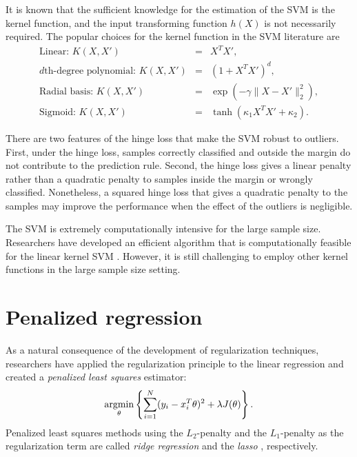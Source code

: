 \documentclass[12pt]{article}
\newcommand{\argmin}{\mathop{\rm argmin}\limits}
\begin{document}
It is known that the sufficient knowledge for the estimation of the SVM is the kernel function, and the input transforming function $h(X)$ is not necessarily required. The popular choices for the kernel function in the SVM literature are
\begin{eqnarray*}
\text{Linear: } K(X,X')&=&X^T X',\\
d\text{th-degree polynomial: } K(X,X')&=&(1 + X^T X')^d,\\
\text{Radial basis: } K(X,X')&=&\exp(-\gamma \|X - X'\|_2^2),\\
\text{Sigmoid: } K(X,X')&=&\tanh(\kappa_1 X^T X' + \kappa_2).
\end{eqnarray*}

There are two features of the hinge loss that make the SVM robust to outliers. First, under the hinge loss, samples correctly classified and outside the margin do not contribute to the prediction rule. Second, the hinge loss gives a linear penalty rather than a quadratic penalty to samples inside the margin or wrongly classified. Nonetheless, a squared hinge loss that gives a quadratic penalty to the samples may improve the performance when the effect of the outliers is negligible.

The SVM is extremely computationally intensive for the large sample size. Researchers have developed an efficient algorithm that is computationally feasible for the linear kernel SVM \parencite{Fan2008}. However, it is still challenging to employ other kernel functions in the large sample size setting.


\section {Penalized regression}

As a natural consequence of the development of regularization techniques, researchers have applied the regularization principle to the linear regression and created a {\it penalized least squares} estimator:
\begin{equation*}
\argmin_{\theta} \left\{\sum_{i=1}^N (y_i - x_i^T \theta)^2 + \lambda J(\theta) \right\}.
\end{equation*}
Penalized least squares methods using the $L_2$-penalty and the $L_1$-penalty as the regularization term are called {\it ridge regression} \parencite{Hoerl1970} and the {\it lasso} \parencite{Tibshirani1996}, respectively.
\end{document}
